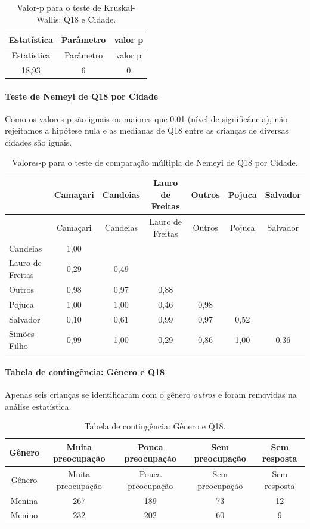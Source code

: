 \documentclass[]{article}
\let\oldparagraph\paragraph
\renewcommand{\paragraph}[1]{\oldparagraph{#1}\mbox{}}
\begin{document}
\begin{longtable}[]{@{}ccc@{}}
\caption{\label{tab:unnamed-chunk-256}Valor-p para o teste de Kruskal-Wallis: Q18 e Cidade.}\tabularnewline
\toprule
Estatística & Parâmetro & valor p\tabularnewline
\midrule
\endfirsthead
\toprule
Estatística & Parâmetro & valor p\tabularnewline
\midrule
\endhead
18,93 & 6 & 0\tabularnewline
\bottomrule
\end{longtable}

\hypertarget{teste-de-nemeyi-de-q18-por-cidade}{%
\paragraph{Teste de Nemeyi de Q18 por Cidade}\label{teste-de-nemeyi-de-q18-por-cidade}}

Como os valores-p são iguais ou maiores que 0.01 (nível de significância), não rejeitamos a hipótese nula e as medianas de Q18 entre as crianças de diversas cidades são iguais.

\begin{longtable}[]{@{}lcccccc@{}}
\caption{\label{tab:unnamed-chunk-258}Valores-p para o teste de comparação múltipla de Nemeyi de Q18 por Cidade.}\tabularnewline
\toprule
& Camaçari & Candeias & Lauro de Freitas & Outros & Pojuca & Salvador\tabularnewline
\midrule
\endfirsthead
\toprule
& Camaçari & Candeias & Lauro de Freitas & Outros & Pojuca & Salvador\tabularnewline
\midrule
\endhead
Candeias & 1,00 & & & & &\tabularnewline
Lauro de Freitas & 0,29 & 0,49 & & & &\tabularnewline
Outros & 0,98 & 0,97 & 0,88 & & &\tabularnewline
Pojuca & 1,00 & 1,00 & 0,46 & 0,98 & &\tabularnewline
Salvador & 0,10 & 0,61 & 0,99 & 0,97 & 0,52 &\tabularnewline
Simões Filho & 0,99 & 1,00 & 0,29 & 0,86 & 1,00 & 0,36\tabularnewline
\bottomrule
\end{longtable}

\cleardoublepage

\hypertarget{tabela-de-continguxeancia-guxeanero-e-q18}{%
\paragraph{Tabela de contingência: Gênero e Q18}\label{tabela-de-continguxeancia-guxeanero-e-q18}}

Apenas seis crianças se identificaram com o gênero \emph{outros} e foram removidas na análise estatística.

\begin{longtable}[]{@{}ccccc@{}}
\caption{\label{tab:unnamed-chunk-259}Tabela de contingência: Gênero e Q18.}\tabularnewline
\toprule
Gênero & Muita preocupação & Pouca preocupação & Sem preocupação & Sem resposta\tabularnewline
\midrule
\endfirsthead
\toprule
Gênero & Muita preocupação & Pouca preocupação & Sem preocupação & Sem resposta\tabularnewline
\midrule
\endhead
Menina & 267 & 189 & 73 & 12\tabularnewline
Menino & 232 & 202 & 60 & 9\tabularnewline
\bottomrule
\end{longtable}
\end{document}
